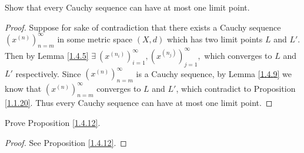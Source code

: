 \begin{exercise}\label{ex 1.4.6}
    Show that every Cauchy sequence can have at most one limit point.
\end{exercise}

\begin{proof}
    Suppose for sake of contradiction that there exists a Cauchy sequence \((x^{(n)})_{n = m}^\infty\) in some metric space \((X, d)\) which has two limit points \(L\) and \(L'\).
    Then by Lemma \ref{1.4.5} \(\exists\ (x^{(n_i)})_{i = 1}^\infty, (x^{(n_j)})_{j = 1}^\infty,\) which converges to \(L\) and \(L'\) respectively.
    Since \((x^{(n)})_{n = m}^\infty\) is a Cauchy sequence, by Lemma \ref{1.4.9} we know that \((x^{(n)})_{n = m}^\infty\) converges to \(L\) and \(L'\), which contradict to Proposition \ref{1.1.20}.
    Thus every Cauchy sequence can have at most one limit point.
\end{proof}

\begin{exercise}\label{ex 1.4.7}
    Prove Proposition \ref{1.4.12}.
\end{exercise}

\begin{proof}
    See Proposition \ref{1.4.12}.
\end{proof}

